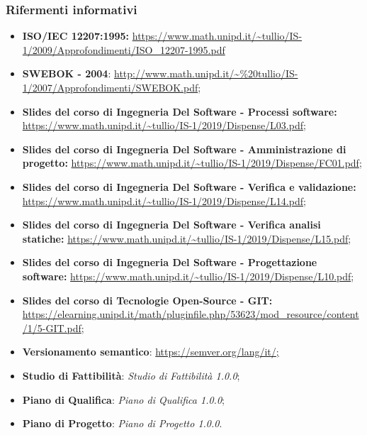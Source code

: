 \subsubsection{Rifermenti informativi}
\begin{itemize}
  \item \textbf{ISO/IEC 12207:1995:} \url{https://www.math.unipd.it/~tullio/IS-1/2009/Approfondimenti/ISO_12207-1995.pdf}
  \item \textbf{SWEBOK - 2004}: \url{http://www.math.unipd.it/~\%20tullio/IS-1/2007/Approfondimenti/SWEBOK.pdf};
  \item \textbf{Slides del corso di Ingegneria Del Software - Processi software:} \url{https://www.math.unipd.it/~tullio/IS-1/2019/Dispense/L03.pdf};
  \item \textbf{Slides del corso di Ingegneria Del Software - Amministrazione di progetto:} \url{https://www.math.unipd.it/~tullio/IS-1/2019/Dispense/FC01.pdf};
  \item \textbf{Slides del corso di Ingegneria Del Software - Verifica e validazione:} \url{https://www.math.unipd.it/~tullio/IS-1/2019/Dispense/L14.pdf};
  \item \textbf{Slides del corso di Ingegneria Del Software - Verifica analisi statiche:} \url{https://www.math.unipd.it/~tullio/IS-1/2019/Dispense/L15.pdf};
  \item \textbf{Slides del corso di Ingegneria Del Software - Progettazione software:} 
  \url{  https://www.math.unipd.it/~tullio/IS-1/2019/Dispense/L10.pdf};
  \item \textbf{Slides del corso di Tecnologie Open-Source - GIT:}   \url{  https://elearning.unipd.it/math/pluginfile.php/53623/mod_resource/content/1/5-GIT.pdf};
  \item \textbf{Versionamento semantico}: \url{https://semver.org/lang/it/;}
  \item \textbf{Studio di Fattibilità}: \textit{Studio di Fattibilità 1.0.0\docs};
  \item \textbf{Piano di Qualifica}: \textit{Piano di Qualifica 1.0.0\docs};
  \item \textbf{Piano di Progetto}: \textit{Piano di Progetto 1.0.0\docs}.
\end{itemize}
